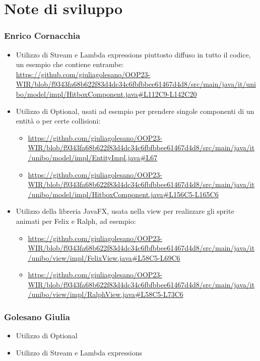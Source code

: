 \documentclass[a4paper,12pt]{report}
\begin{document}
\section{Note di sviluppo}

\subsubsection{Enrico Cornacchia}
\begin{itemize}
    \item Utilizzo di Stream e Lambda expressions piuttosto diffuso in tutto il codice, un esempio che contiene entrambe:
    \url{https://github.com/giuliagolesano/OOP23-WIR/blob/f9343fa68b622f83d4dc34c6fbfbbee61467d4d8/src/main/java/it/unibo/model/impl/HitboxComponent.java#L112C9-L142C20}
    \item Utilizzo di Optional, usati ad esempio per prendere singole componenti di un entità o per certe collisioni:
    \begin{itemize}
        \item \url{https://github.com/giuliagolesano/OOP23-WIR/blob/f9343fa68b622f83d4dc34c6fbfbbee61467d4d8/src/main/java/it/unibo/model/impl/EntityImpl.java#L67}
        \item \url{https://github.com/giuliagolesano/OOP23-WIR/blob/f9343fa68b622f83d4dc34c6fbfbbee61467d4d8/src/main/java/it/unibo/model/impl/HitboxComponent.java#L156C5-L165C6}
    \end{itemize}
    \item Utilizzo della libreria JavaFX, usata nella view per realizzare gli sprite animati per Felix e Ralph, ad esempio:
    \begin{itemize}
        \item \url{https://github.com/giuliagolesano/OOP23-WIR/blob/f9343fa68b622f83d4dc34c6fbfbbee61467d4d8/src/main/java/it/unibo/view/impl/FelixView.java#L58C5-L69C6}
        \item \url{https://github.com/giuliagolesano/OOP23-WIR/blob/f9343fa68b622f83d4dc34c6fbfbbee61467d4d8/src/main/java/it/unibo/view/impl/RalphView.java#L58C5-L73C6}
    \end{itemize}
\end{itemize}

\subsubsection{Golesano Giulia}
\begin{itemize}
\item Utilizzo di Optional
    \item Utilizzo di Stream e Lambda expressions
    \end{itemize}
\end{document}
